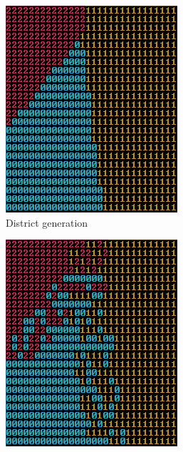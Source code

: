 		\begin{figure}[h]
			\begin{subfigure}{0.5\textwidth}
				\centering
				\includegraphics[width=0.9\linewidth]{"Images/map districts colored"}
				\caption{District generation}
				\label{fig:map-districts}
			\end{subfigure}
			\begin{subfigure}{0.5\textwidth}
				\centering
				\includegraphics[width=0.9\linewidth]{"Images/map borders colored"}

\end{subfigure}
\end{figure}
